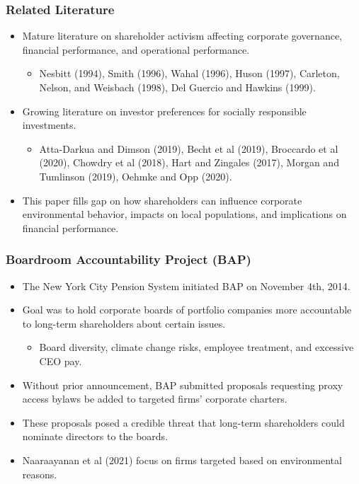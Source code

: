 \documentclass{beamer}
\begin{document}
\begin{frame}
\frametitle{Related Literature}
\begin{itemize}[<+->]
\item Mature literature on shareholder activism affecting corporate governance, financial performance, and operational performance.
\begin{itemize}
\item Nesbitt (1994), Smith (1996), Wahal (1996), Huson (1997), Carleton, Nelson, and Weisbach (1998), Del Guercio and Hawkins (1999).
\end{itemize}
\bigskip
\item Growing literature on investor preferences for socially responsible investments.
\begin{itemize}
\item Atta-Darkua and Dimson (2019), Becht et al (2019), Broccardo et al (2020), Chowdry et al (2018), Hart and Zingales (2017), Morgan and Tumlinson (2019), Oehmke and Opp (2020).
\end{itemize}
\bigskip
\item This paper fills gap on how shareholders can influence corporate environmental behavior, impacts on local populations, and implications on financial performance.
\end{itemize}
\end{frame}


\begin{frame}
\frametitle{Boardroom Accountability Project (BAP)}
\begin{itemize}[<+->]
\item The New York City Pension System initiated BAP on November 4th, 2014.
\bigskip
\item Goal was to hold corporate boards of portfolio companies more accountable to long-term shareholders about certain issues.
\begin{itemize}
\item Board diversity, climate change risks, employee treatment, and excessive CEO pay.
\end{itemize}
\bigskip
\item Without prior announcement, BAP submitted proposals requesting proxy access bylaws be added to targeted firms' corporate charters.
\bigskip
\item These proposals posed a credible threat that long-term shareholders could nominate directors to the boards.
\bigskip
\item Naaraayanan et al (2021) focus on firms targeted based on environmental reasons.
\end{itemize}
\end{frame}
\end{document}
